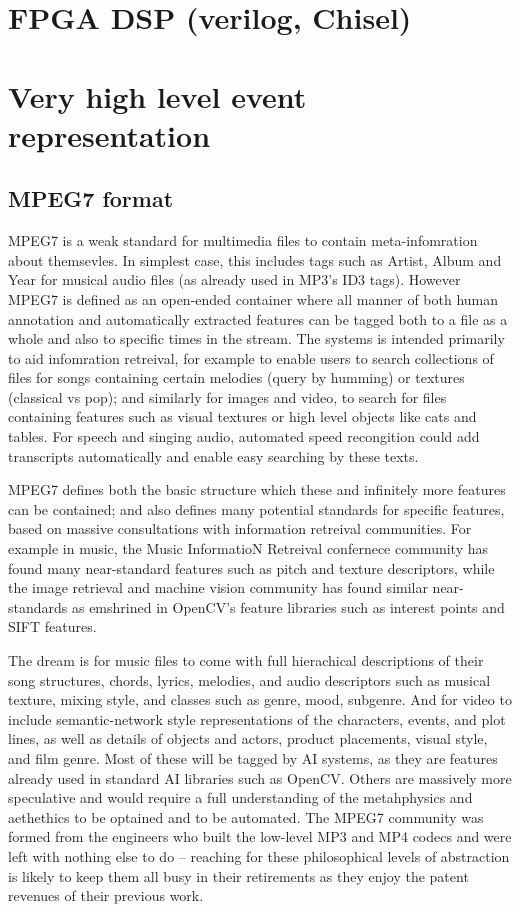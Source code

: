 \documentclass[oneside,english]{scrbook}
\begin{document}
\chapter{FPGA DSP (verilog, Chisel)}


\chapter{Very high level event representation}

\section{MPEG7 format}

MPEG7 is a weak standard for multimedia files to contain meta-infomration about themsevles.  In simplest case, this includes tags such as Artist, Album and Year for musical audio files (as already used in MP3's ID3 tags).  However MPEG7 is defined as an open-ended container where all manner of both human annotation and automatically extracted features can be tagged both to a file as a whole and also to specific times in the stream.  The systems is intended primarily to aid infomration retreival, for example to enable users to search collections of files for songs containing certain melodies (query by humming) or textures (classical vs pop); and similarly for images and video, to search for files containing features such as visual textures or high level objects like cats and tables.   For speech and singing audio, automated speed recongition could add transcripts automatically and enable easy searching by these texts.

MPEG7 defines both the basic structure which these and infinitely more features can be contained; and also defines many potential standards for specific features, based on massive consultations with information retreival communities.   For example in music, the Music InformatioN Retreival confernece community has found many near-standard features such as pitch and texture descriptors, while the image retrieval and machine vision community has found similar near-standards as emshrined in OpenCV's feature libraries such as interest points and SIFT features.

The dream is for music files to come with full hierachical descriptions of their song structures, chords, lyrics, melodies, and audio descriptors such as musical texture, mixing style, and classes such as genre, mood, subgenre.   And for video to include semantic-network style representations of the characters, events, and plot lines, as well as details of objects and actors, product placements, visual style, and film genre.  Most of these will be tagged by AI systems, as they are features already used in standard AI libraries such as OpenCV.   Others are massively more speculative and would require a full understanding of the metahphysics and aethethics to be optained and to be automated.   The MPEG7 community was formed from the engineers who built the low-level MP3 and MP4 codecs and were left with nothing else to do -- reaching for these philosophical levels of abstraction is likely to keep them all busy in their retirements as they enjoy the patent revenues of their previous work.
\end{document}
